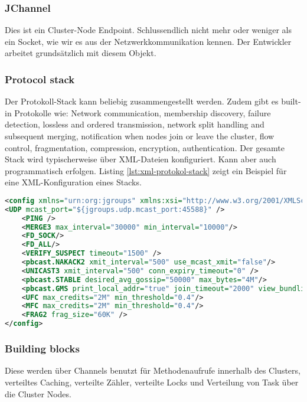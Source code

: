 \subsubsection{JChannel}

Dies ist ein Cluster-Node Endpoint. Schlussendlich nicht mehr oder weniger als ein Socket, wie wir es aus der Netzwerkkommunikation kennen. Der Entwickler arbeitet grundsätzlich mit diesem Objekt.
	
\subsubsection{Protocol stack} 

Der Protokoll-Stack kann beliebig zusammengestellt werden. Zudem gibt es built-in Protokolle wie: Network communication, membership discovery, failure detection, lossless and ordered transmission, network split handling and subsequent merging, notification when nodes join or leave the cluster, flow control, fragmentation, compression, encryption, authentication. Der gesamte Stack wird typischerweise über XML-Dateien konfiguriert. Kann aber auch programmatisch erfolgen. Listing \ref{lst:xml-protokol-stack} zeigt ein Beispiel für eine XML-Konfiguration eines Stacks.
	
\newpage
	
\begin{lstlisting}[language=XML, caption=XML für Protokoll Stack, label=lst:xml-protokol-stack]
<config xmlns="urn:org:jgroups" xmlns:xsi="http://www.w3.org/2001/XMLSchema-instance" xsi:schemaLocation="urn:org:jgroups	http://www.jgroups.org/schema/jgroups.xsd">
<UDP mcast_port="${jgroups.udp.mcast_port:45588}" />
	<PING />
	<MERGE3 max_interval="30000" min_interval="10000"/>
	<FD_SOCK/>
	<FD_ALL/>
	<VERIFY_SUSPECT timeout="1500" />
	<pbcast.NAKACK2 xmit_interval="500" use_mcast_xmit="false"/>
	<UNICAST3 xmit_interval="500" conn_expiry_timeout="0" />
	<pbcast.STABLE desired_avg_gossip="50000" max_bytes="4M"/>
	<pbcast.GMS print_local_addr="true" join_timeout="2000" view_bundling="true"/>
	<UFC max_credits="2M" min_threshold="0.4"/>
	<MFC max_credits="2M" min_threshold="0.4"/>
	<FRAG2 frag_size="60K" />
</config>
\end{lstlisting}

\subsubsection{Building blocks} 

Diese werden über Channels benutzt für Methodenaufrufe innerhalb des Clusters, verteiltes Caching, verteilte Zähler, verteilte Locks und Verteilung von Task über die Cluster Nodes.

